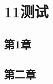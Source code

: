 \documentclass{standalone}
\begin{document}
\thesistranslationchinese
\section{11测试}
\subsection{第1章}
\subsection{第二章}
\end{document}
